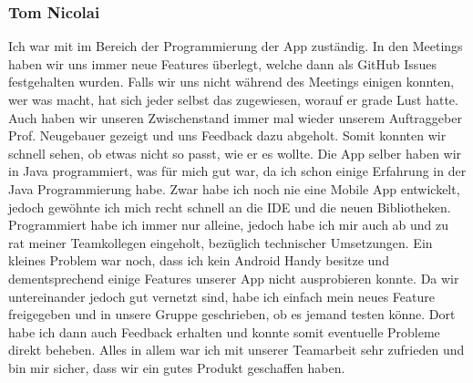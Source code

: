 \documentclass[10pt]{article}
\begin{document}
\subsubsection{Tom Nicolai}
    Ich war mit im Bereich der Programmierung der App zuständig. In den Meetings haben wir uns immer neue Features überlegt, 
    welche dann als GitHub Issues festgehalten wurden. Falls wir uns nicht während des Meetings einigen konnten, wer was macht, 
    hat sich jeder selbst das zugewiesen, worauf er grade Lust hatte. Auch haben wir unseren Zwischenstand immer mal wieder unserem 
    Auftraggeber Prof. Neugebauer gezeigt und uns Feedback dazu abgeholt. Somit konnten wir schnell sehen, ob etwas nicht so passt, 
    wie er es wollte. Die App selber haben wir in Java programmiert, was für mich gut war, da ich schon einige Erfahrung 
    in der Java Programmierung habe. Zwar habe ich noch nie eine Mobile App entwickelt, jedoch gewöhnte ich mich recht schnell 
    an die IDE und die neuen Bibliotheken. Programmiert habe ich immer nur alleine, jedoch habe ich mir auch ab und zu rat meiner 
    Teamkollegen eingeholt, bezüglich technischer Umsetzungen. Ein kleines Problem war noch, dass ich kein Android Handy besitze 
    und dementsprechend einige Features unserer App nicht ausprobieren konnte. Da wir untereinander jedoch gut vernetzt sind, 
    habe ich einfach mein neues Feature freigegeben und in unsere Gruppe geschrieben, ob es jemand testen könne. 
    Dort habe ich dann auch Feedback erhalten und konnte somit eventuelle Probleme direkt beheben. Alles in allem 
    war ich mit unserer Teamarbeit sehr zufrieden und bin mir sicher, dass wir ein gutes Produkt geschaffen haben.
\end{document}
